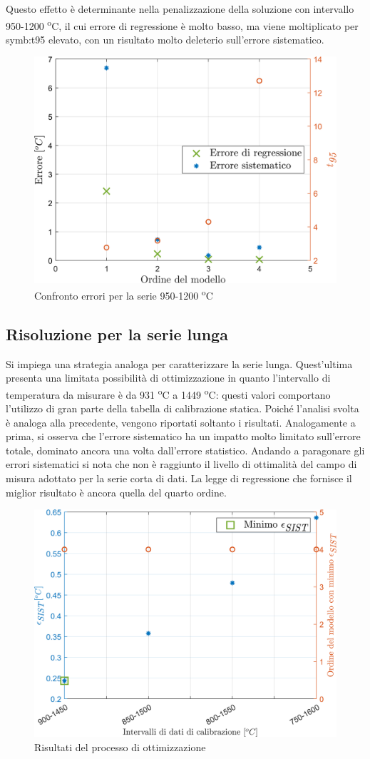 Questo effetto è determinante nella penalizzazione della soluzione con intervallo 950-1200 \textsuperscript{o}C, il cui errore di regressione è molto basso, ma viene moltiplicato per \gls{symb:t95} elevato, con un risultato molto deleterio sull'errore sistematico. 

\begin{figure} [H]
	\centering
	\includegraphics[width=0.5\linewidth]{"../sperimentazione nei propulsori/err_sist_short_test"}
	\caption{Confronto errori per la serie 950-1200 \textsuperscript{o}C}
	\label{fig:errsistshorttest}
\end{figure}

\subsection{Risoluzione per la serie lunga}
Si impiega una strategia analoga per caratterizzare la serie lunga. Quest'ultima presenta una limitata possibilità di ottimizzazione in quanto l'intervallo di temperatura da misurare è da 931 \textsuperscript{o}C a 1449 \textsuperscript{o}C: questi valori comportano l'utilizzo di gran parte della tabella di calibrazione statica. Poiché l'analisi svolta è analoga alla precedente, vengono riportati soltanto i risultati. Analogamente a prima, si osserva che l'errore sistematico ha un impatto molto limitato sull'errore totale, dominato ancora una volta dall'errore statistico.
Andando a paragonare gli errori sistematici si nota che non è raggiunto il livello di ottimalità del campo di misura adottato per la serie corta di dati.  La legge di regressione che fornisce il miglior risultato è ancora quella del quarto ordine. 

\begin{figure} [H]
	\centering
	\includegraphics[width=0.6\linewidth]{"../sperimentazione nei propulsori/err_sist_long"}
	\caption{Risultati del processo di ottimizzazione}
	\label{fig:errsistlong}
\end{figure}

